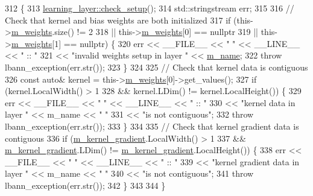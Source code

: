 \begin{DoxyCode}
312                                       \{
313     \hyperlink{classlbann_1_1Layer_aeec1c710c3d53b5e43a4d4f67b0a21b2}{learning\_layer::check\_setup}();
314     std::stringstream err;
315 
316     \textcolor{comment}{// Check that kernel and bias weights are both initialized}
317     \textcolor{keywordflow}{if} (this->\hyperlink{classlbann_1_1Layer_a7954e30fbf9100a6ba4b56d02767a469}{m\_weights}.size() != 2
318         || this->\hyperlink{classlbann_1_1Layer_a7954e30fbf9100a6ba4b56d02767a469}{m\_weights}[0] == \textcolor{keyword}{nullptr}
319         || this->\hyperlink{classlbann_1_1Layer_a7954e30fbf9100a6ba4b56d02767a469}{m\_weights}[1] == \textcolor{keyword}{nullptr}) \{
320       err << \_\_FILE\_\_ << \textcolor{stringliteral}{" "} << \_\_LINE\_\_ << \textcolor{stringliteral}{" :: "}
321           << \textcolor{stringliteral}{"invalid weights setup in layer "} << \hyperlink{classlbann_1_1Layer_aa47109ad09b399142fa92f9d3702189f}{m\_name};
322       \textcolor{keywordflow}{throw} lbann\_exception(err.str());
323     \}
324 
325     \textcolor{comment}{// Check that kernel data is contiguous}
326     \textcolor{keyword}{const} \textcolor{keyword}{auto}& kernel = this->\hyperlink{classlbann_1_1Layer_a7954e30fbf9100a6ba4b56d02767a469}{m\_weights}[0]->get\_values();
327     \textcolor{keywordflow}{if} (kernel.LocalWidth() > 1
328         && kernel.LDim() != kernel.LocalHeight()) \{
329       err << \_\_FILE\_\_ << \textcolor{stringliteral}{" "} << \_\_LINE\_\_ << \textcolor{stringliteral}{" :: "}
330           << \textcolor{stringliteral}{"kernel data in layer "} << m\_name << \textcolor{stringliteral}{" "}
331           << \textcolor{stringliteral}{"is not contiguous"};
332       \textcolor{keywordflow}{throw} lbann\_exception(err.str());
333     \}
334 
335     \textcolor{comment}{// Check that kernel gradient data is contiguous}
336     \textcolor{keywordflow}{if} (\hyperlink{classlbann_1_1base__convolution__layer_a4129f11df61ed92bcad24ae855d7bd11}{m\_kernel\_gradient}.LocalWidth() > 1
337         && \hyperlink{classlbann_1_1base__convolution__layer_a4129f11df61ed92bcad24ae855d7bd11}{m\_kernel\_gradient}.LDim() != \hyperlink{classlbann_1_1base__convolution__layer_a4129f11df61ed92bcad24ae855d7bd11}{m\_kernel\_gradient}.LocalHeight()) \{
338       err << \_\_FILE\_\_ << \textcolor{stringliteral}{" "} << \_\_LINE\_\_ << \textcolor{stringliteral}{" :: "}
339           << \textcolor{stringliteral}{"kernel gradient data in layer "} << m\_name << \textcolor{stringliteral}{" "}
340           << \textcolor{stringliteral}{"is not contiguous"};
341       \textcolor{keywordflow}{throw} lbann\_exception(err.str());
342     \}
343 
344   \}
\end{DoxyCode}
